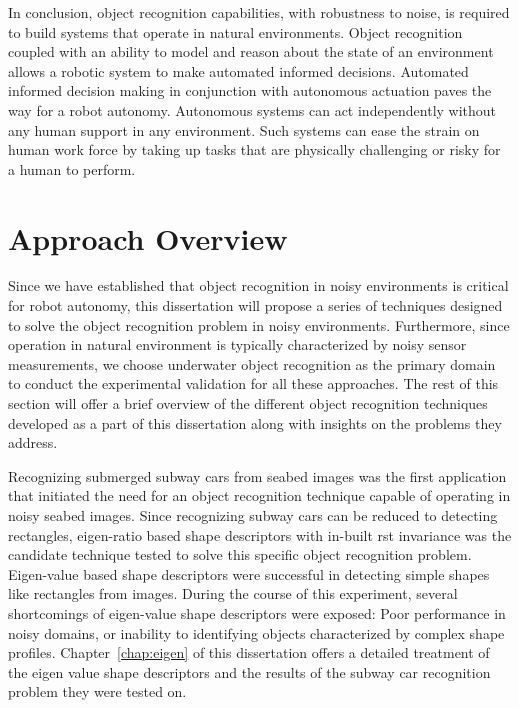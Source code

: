 \documentclass {udthesis}
\begin{document}
In conclusion, object recognition capabilities, with robustness to noise, is required to build systems that operate in natural environments. Object recognition coupled with an ability to model and reason about the state of an environment allows a robotic system to make automated informed decisions. Automated informed decision making in conjunction with autonomous actuation paves the way for a robot autonomy. Autonomous systems can act independently without any human support in any environment. Such systems can ease the strain on human work force by taking up tasks that are physically challenging or risky for a human to perform.

\section{Approach Overview}

Since we have established that object recognition in noisy environments is critical for robot autonomy, this dissertation will propose a series of techniques designed to solve the object recognition problem in noisy environments.
Furthermore, since operation in natural environment is typically characterized by noisy sensor measurements, we choose
underwater object recognition as the primary domain to conduct the experimental validation for all these approaches.
The rest of this section will offer a brief overview of the different object recognition techniques developed as a part of this dissertation along with insights on the problems they address.

Recognizing submerged subway cars from seabed images was the first application that initiated the need for 
an object recognition technique capable of operating in noisy seabed images. Since recognizing subway cars can be reduced 
to detecting rectangles, eigen-ratio based shape descriptors with in-built \gls{rst} invariance was the candidate technique tested
to solve this specific object recognition problem. Eigen-value based shape descriptors were successful in detecting 
simple shapes like rectangles from images.
During the course of this experiment, several shortcomings of eigen-value shape descriptors were exposed: Poor performance in noisy domains, or inability to identifying objects characterized by complex shape profiles. Chapter~\ref{chap:eigen} of this dissertation offers a detailed treatment of the eigen value shape descriptors and the results of the subway car recognition problem they were tested on.
\end{document}
